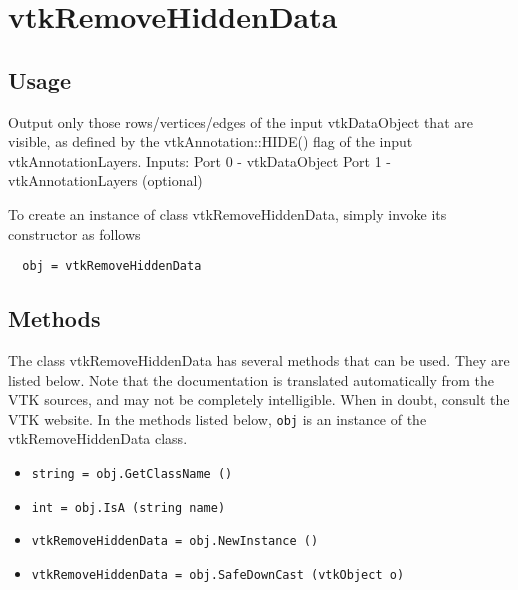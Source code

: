 \section{vtkRemoveHiddenData}

\subsection{Usage}

 Output only those rows/vertices/edges of the input vtkDataObject that 
 are visible, as defined by the vtkAnnotation::HIDE() flag of the input 
 vtkAnnotationLayers.
 Inputs:
    Port 0 - vtkDataObject
    Port 1 - vtkAnnotationLayers (optional)


To create an instance of class vtkRemoveHiddenData, simply
invoke its constructor as follows
\begin{verbatim}
  obj = vtkRemoveHiddenData
\end{verbatim}
\subsection{Methods}

The class vtkRemoveHiddenData has several methods that can be used.
  They are listed below.
Note that the documentation is translated automatically from the VTK sources,
and may not be completely intelligible.  When in doubt, consult the VTK website.
In the methods listed below, \verb|obj| is an instance of the vtkRemoveHiddenData class.
\begin{itemize}
\item  \verb|string = obj.GetClassName ()|

\item  \verb|int = obj.IsA (string name)|

\item  \verb|vtkRemoveHiddenData = obj.NewInstance ()|

\item  \verb|vtkRemoveHiddenData = obj.SafeDownCast (vtkObject o)|

\end{itemize}
